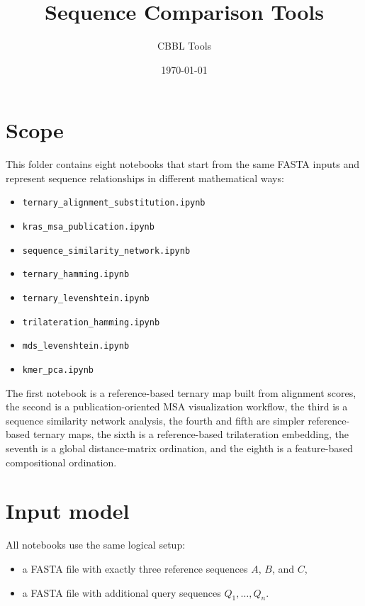 \documentclass[11pt,a4paper]{article}
\title{Sequence Comparison Tools}
\author{CBBL Tools}
\date{\today}
\begin{document}
\maketitle

\tableofcontents

\section{Scope}

This folder contains eight notebooks that start from the same FASTA inputs and represent sequence relationships in different mathematical ways:

\begin{itemize}[leftmargin=*]
\item \texttt{ternary\_alignment\_substitution.ipynb}
\item \texttt{kras\_msa\_publication.ipynb}
\item \texttt{sequence\_similarity\_network.ipynb}
\item \texttt{ternary\_hamming.ipynb}
\item \texttt{ternary\_levenshtein.ipynb}
\item \texttt{trilateration\_hamming.ipynb}
\item \texttt{mds\_levenshtein.ipynb}
\item \texttt{kmer\_pca.ipynb}
\end{itemize}

The first notebook is a reference-based ternary map built from alignment scores, the second is a publication-oriented MSA visualization workflow, the third is a sequence similarity network analysis, the fourth and fifth are simpler reference-based ternary maps, the sixth is a reference-based trilateration embedding, the seventh is a global distance-matrix ordination, and the eighth is a feature-based compositional ordination.

\section{Input model}

All notebooks use the same logical setup:

\begin{itemize}[leftmargin=*]
\item a FASTA file with exactly three reference sequences $A$, $B$, and $C$,
\item a FASTA file with additional query sequences $Q_1,\dots,Q_n$.
\end{itemize}
\end{document}
